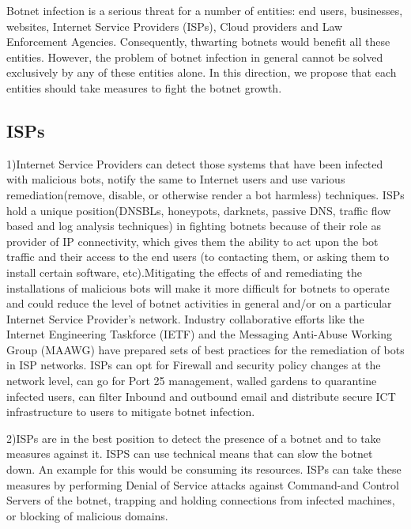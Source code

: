 \label{cap:sec1}


Botnet infection is a serious threat for a number of entities: end users, businesses, websites, Internet Service Providers (ISPs), Cloud providers and Law Enforcement Agencies. Consequently, thwarting botnets would benefit all these entities. However, the problem of botnet infection in general cannot be solved exclusively by any of these entities alone. In this direction, we propose that each entities should take measures to fight the botnet growth.

\subsection{ISPs}

1)Internet Service Providers can detect those systems that have been infected with malicious bots, notify the same to Internet users and use various remediation(remove, disable, or otherwise render a bot harmless) techniques. ISPs hold a unique position(DNSBLs, honeypots, darknets, passive DNS, traffic flow based and log analysis techniques) in fighting botnets because of  their role as provider of IP connectivity, which gives them the ability to act upon the bot traffic and their access to the end users (to contacting them, or asking them to install certain software, etc).Mitigating the effects of and remediating the installations of malicious bots will make it more difficult for botnets to operate and could reduce the level of botnet activities in general and/or on a particular Internet Service Provider's network. Industry collaborative efforts like the Internet Engineering Taskforce (IETF) and the Messaging Anti-Abuse Working Group (MAAWG) have prepared sets of best practices for the remediation of bots in ISP networks. ISPs can opt for Firewall and security policy changes at the network level, can go for Port 25 management, walled gardens to quarantine infected users, can filter Inbound and outbound email and distribute secure ICT infrastructure to users to mitigate botnet infection. 

2)ISPs are in the best position to detect the presence of a botnet and to take measures against it. ISPS can use technical means that can slow the botnet down. An example for this would be consuming its resources. ISPs can take these measures by performing Denial of Service attacks against Command-and Control Servers of the botnet, trapping and holding connections from infected machines, or blocking of malicious domains.

